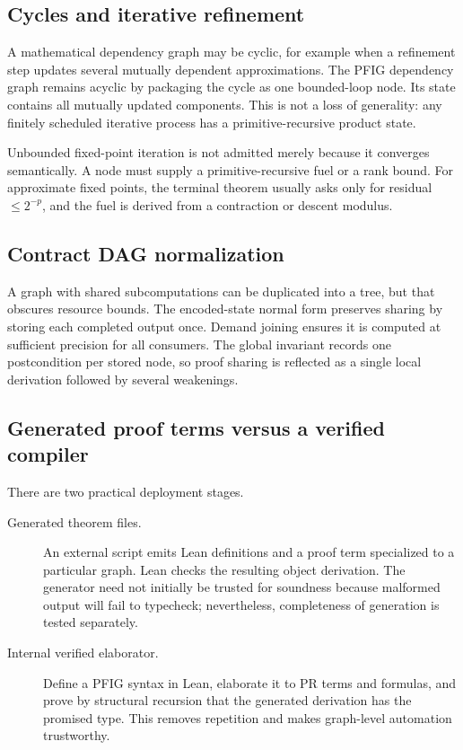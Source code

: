 \subsection{Cycles and iterative refinement}

A mathematical dependency graph may be cyclic, for example when a refinement step updates several mutually dependent approximations.  The PFIG dependency graph remains acyclic by packaging the cycle as one bounded-loop node.  Its state contains all mutually updated components.  This is not a loss of generality: any finitely scheduled iterative process has a primitive-recursive product state.

Unbounded fixed-point iteration is not admitted merely because it converges semantically.  A node must supply a primitive-recursive fuel or a rank bound.  For approximate fixed points, the terminal theorem usually asks only for residual \(\le 2^{-p}\), and the fuel is derived from a contraction or descent modulus.

\subsection{Contract DAG normalization}

A graph with shared subcomputations can be duplicated into a tree, but that obscures resource bounds.  The encoded-state normal form preserves sharing by storing each completed output once.  Demand joining ensures it is computed at sufficient precision for all consumers.  The global invariant records one postcondition per stored node, so proof sharing is reflected as a single local derivation followed by several weakenings.

\subsection{Generated proof terms versus a verified compiler}

There are two practical deployment stages.

\begin{description}
\item[Generated theorem files.]  An external script emits Lean definitions and a proof term specialized to a particular graph.  Lean checks the resulting object derivation.  The generator need not initially be trusted for soundness because malformed output will fail to typecheck; nevertheless, completeness of generation is tested separately.
\item[Internal verified elaborator.]  Define a PFIG syntax in Lean, elaborate it to PR terms and formulas, and prove by structural recursion that the generated derivation has the promised type.  This removes repetition and makes graph-level automation trustworthy.
\end{description}

